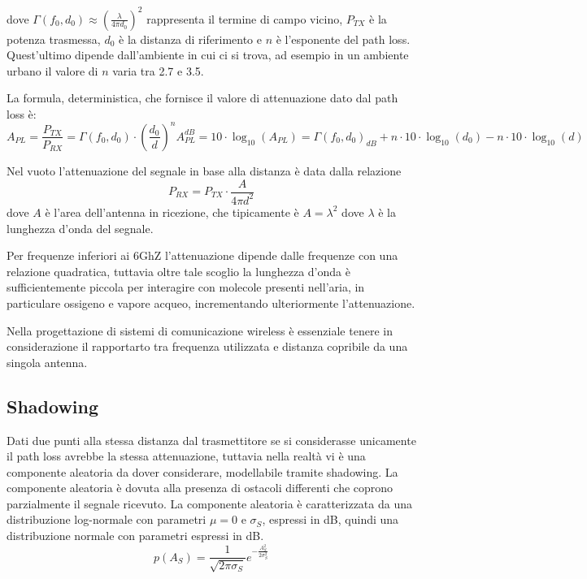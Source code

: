 dove \( \Gamma(f_0, d_0) \approx \left( \frac{\lambda}{4 \pi d_0} \right)^2 \) rappresenta il termine di campo vicino, \( P_{TX} \) è la potenza trasmessa, \( d_0 \) è la distanza di riferimento e \( n \) è l'esponente del path loss. Quest'ultimo dipende dall'ambiente in cui ci si trova, ad esempio in un ambiente urbano il valore di \( n \) varia tra 2.7 e 3.5.



La formula, deterministica, che fornisce il valore di attenuazione dato dal path loss è:
\[
    A_{PL} = \frac{P_{TX}}{P_{RX}} = \Gamma(f_0, d_0) \cdot \left( \frac{d_0}{d} \right)^n
    A_{PL}^{dB} = 10 \cdot \log_{10}(A_{PL}) = \Gamma(f_0, d_0)_{dB} + n \cdot 10 \cdot \log_{10}(d_0) - n \cdot 10 \cdot \log_{10}(d)
\]


Nel vuoto l'attenuazione del segnale in base alla distanza è data dalla relazione
\[
    P_{RX} = P_{TX} \cdot \frac{A}{4\pi d^2}  
\]
dove \( A \) è l'area dell'antenna in ricezione, che tipicamente è \( A = \lambda^2 \) dove \( \lambda \) è la lunghezza d'onda del segnale.


Per frequenze inferiori ai 6GhZ l'attenuazione dipende dalle frequenze con una relazione quadratica, tuttavia oltre tale scoglio la lunghezza d'onda è sufficientemente piccola per interagire con molecole presenti nell'aria, in particulare ossigeno e vapore acqueo, incrementando ulteriormente l'attenuazione.

Nella progettazione di sistemi di comunicazione wireless è essenziale tenere in considerazione il rapportarto tra frequenza utilizzata e distanza copribile da una singola antenna.

\subsection*{Shadowing}

Dati due punti alla stessa distanza dal trasmettitore se si considerasse unicamente il path loss avrebbe la stessa attenuazione, tuttavia nella realtà vi è una componente aleatoria da dover considerare, modellabile tramite shadowing. La componente aleatoria è dovuta alla presenza di ostacoli differenti che coprono parzialmente il segnale ricevuto. La componente aleatoria è caratterizzata da una distribuzione log-normale con parametri $\mu = 0$ e $\sigma_S$, espressi in dB, quindi una distribuzione normale con parametri espressi in dB.
\begin{equation}
    p(A_S) = \frac{1}{\sqrt{2\pi \sigma_S}} e^{-\frac{A_S^2}{2\sigma_S^2}}
\end{equation}




